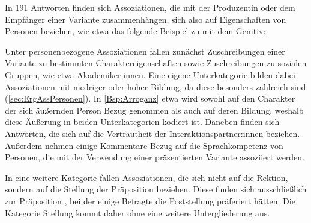 In 191 Antworten finden sich Assoziationen, die mit der Produzentin oder dem Empfänger einer Variante zusammenhängen, sich also auf Eigenschaften von Personen beziehen, wie etwa das folgende Beispiel zu \dank{} mit dem Genitiv: 
\begin{exe}
\ex {} \label{Bsp:Arroganz}
\end{exe}
Unter personenbezogene Assoziationen fallen zunächst Zuschreibungen einer Variante zu bestimmten Charaktereigenschaften sowie Zuschreibungen zu sozialen Gruppen, wie etwa Akademiker:innen.
Eine eigene Unterkategorie bilden dabei Assoziationen mit niedriger oder hoher Bildung, da diese besonders zahlreich sind (\autoref{sec:ErgAssPersonen}). 
In \autoref{Bsp:Arroganz} etwa wird sowohl auf den Charakter der sich äußernden Person Bezug genommen als auch auf deren Bildung, weshalb diese Äußerung in beiden Unterkategorien kodiert ist. 
Daneben finden sich Antworten, die sich auf die Vertrautheit der Interaktionspartner:innen beziehen. 
Außerdem nehmen einige Kommentare Bezug auf die Sprachkompetenz von Personen, die mit der Verwendung einer präsentierten Variante assoziiert werden. 

In eine weitere Kategorie fallen Assoziationen, die sich nicht auf die Rektion, sondern auf die Stellung der Präposition beziehen. 
Diese finden sich ausschließlich zur Präposition \gegenueber, bei der einige Befragte die Poststellung präferiert hätten. 
Die Kategorie \glqq Stellung\grqq{} kommt daher ohne eine weitere Untergliederung aus. 

